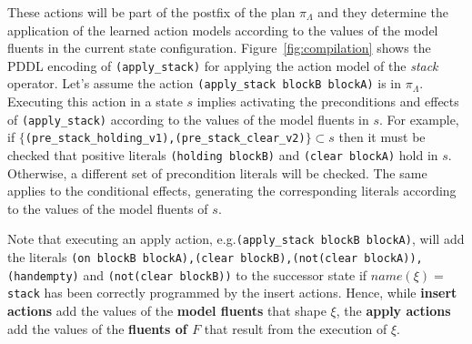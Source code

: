 \begin{itemize}
\begin{enumerate}
    These actions will be part of the postfix of the plan $\pi_\Lambda$ and they determine the application of the learned action models according to the values of the model fluents in the current state configuration. Figure~\ref{fig:compilation} shows the PDDL encoding of {\tt{\small (apply\_stack)}} for applying the action model of the {\em stack} operator. Let's assume the action {\tt{\small (apply\_stack blockB blockA)}} is in $\pi_\Lambda$. Executing this action in a state $s$ implies activating the preconditions and effects of {\tt{\small (apply\_stack)}} according to the values of the model fluents in $s$. For example, if  $\{${\tt{\small (pre\_stack\_holding\_v1),(pre\_stack\_clear\_v2)}}$\} \subset s$ then it must be checked that positive literals {\tt{\small (holding blockB)}} and {\tt{\small (clear blockA)}} hold in $s$. Otherwise, a different set of precondition literals will be checked. The same applies to the conditional effects, generating the corresponding literals according to the values of the model fluents of $s$.

Note that executing an apply action, e.g.{\tt{\small (apply\_stack blockB blockA)}}, will add the literals {\tt{\small (on blockB blockA),(clear blockB),(not(clear blockA)),(handempty)}} and {\tt{\small(not(clear blockB))}} to the successor state if $name(\xi)=${\tt{\small stack}} has been correctly programmed by the insert actions. Hence, while \textbf{insert actions} add the values of the \textbf{model fluents} that shape $\xi$, the \textbf{apply actions} add the values of the \textbf{fluents of $F$} that result from the execution of $\xi$.



\end{enumerate}
\end{itemize}
